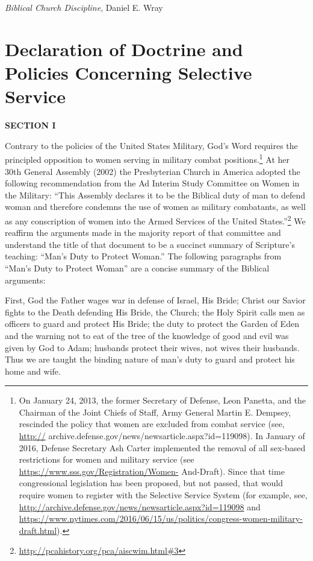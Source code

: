 \documentclass[
]{book}
\begin{document}
\emph{Biblical Church Discipline}, Daniel E. Wray

\hypertarget{declaration-of-doctrine-and-policies-concerning-selective-service}{%
\chapter{Declaration of Doctrine and Policies Concerning Selective Service}\label{declaration-of-doctrine-and-policies-concerning-selective-service}}

\textbf{SECTION I}

Contrary to the policies of the United States Military, God's Word requires the principled opposition to women serving in military combat positions.\footnote{On January 24, 2013, the former Secretary of Defense, Leon Panetta, and the Chairman of the Joint Chiefs of Staff, Army General Martin E. Dempsey, rescinded the policy that women are excluded from combat service (see, \url{http://} archive.defense.gov/news/newsarticle.aspx?id=119098). In January of 2016, Defense Secretary Ash Carter implemented the removal of all sex-based restrictions for women and military service (see \url{https://www.sss.gov/Registration/Women-} And-Draft). Since that time congressional legislation has been proposed, but not passed, that would require women to register with the Selective Service System (for example, see, \url{http://archive.defense.gov/news/newsarticle.aspx?id=119098} and \url{https://www.nytimes.com/2016/06/15/us/politics/congress-women-military-draft.html}).} At her 30th General Assembly (2002) the Presbyterian Church in America adopted the following recommendation from the Ad Interim Study Committee on Women in the Military: ``This Assembly declares it to be the Biblical duty of man to defend woman and therefore condemns the use of women as military combatants, as well as any conscription of women into the Armed Services of the United States.''\footnote{\url{http://pcahistory.org/pca/aiscwim.html\#3}} We reaffirm the arguments made in the majority report of that committee and understand the title of that document to be a succinct summary of Scripture's teaching: ``Man's Duty to Protect Woman.'' The following paragraphs from ``Man's Duty to Protect Woman'' are a concise summary of the Biblical arguments:

First, God the Father wages war in defense of Israel, His Bride; Christ our Savior fights to the Death defending His Bride, the Church; the Holy Spirit calls men as officers to guard and protect His Bride; the duty to protect the Garden of Eden and the warning not to eat of the tree of the knowledge of good and evil was given by God to Adam; husbands protect their wives, not wives their husbands. Thus we are taught the binding nature of man's duty to guard and protect his home and wife.
\end{document}
